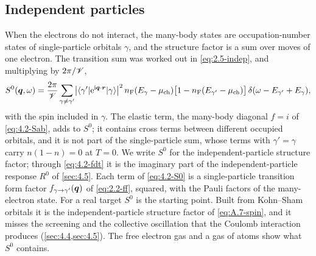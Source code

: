 \subsection{Independent particles}

When the electrons do not interact, the many-body states are occupation-number states of single-particle orbitals $\gamma$, and the structure factor is a sum over moves of one electron. The transition sum was worked out in \cref{eq:2.5-indep}, and multiplying by $2\pi/\mathscr{V}$,
\begin{equation}
  S^0(\bm{q},\omega) = \frac{2\pi}{\mathscr{V}}\sum_{\gamma\ne\gamma'}\bigl|\langle\gamma'|\mathrm{e}^{\mathrm{i}\bm{q}\cdot\bm{r}}|\gamma\rangle\bigr|^2\,n_{\mathrm{F}}(E_\gamma - \mu_{\mathrm{ch}})\bigl[1 - n_{\mathrm{F}}(E_{\gamma'} - \mu_{\mathrm{ch}})\bigr]\,\delta(\omega - E_{\gamma'} + E_\gamma) ,
  \label{eq:4.2-S0}
\end{equation}
with the spin included in $\gamma$. The elastic term, the many-body diagonal $f = i$ of \cref{eq:4.2-Sab}, adds to $S^0$; it contains cross terms between different occupied orbitals, and it is not part of the single-particle sum, whose terms with $\gamma' = \gamma$ carry $n(1 - n) = 0$ at $T = 0$. We write $S^0$ for the independent-particle structure factor; through \cref{eq:4.2-fdt} it is the imaginary part of the independent-particle response $R^0$ of \cref{sec:4.5}. Each term of \cref{eq:4.2-S0} is a single-particle transition form factor $f_{\gamma\to\gamma'}(\bm{q})$ of \cref{eq:2.2-ff}, squared, with the Pauli factors of the many-electron state. For a real target $S^0$ is the starting point. Built from Kohn--Sham orbitals it is the independent-particle structure factor of \cref{eq:A.7-spin}, and it misses the screening and the collective oscillation that the Coulomb interaction produces (\cref{sec:4.4,sec:4.5}). The free electron gas and a gas of atoms show what $S^0$ contains.

